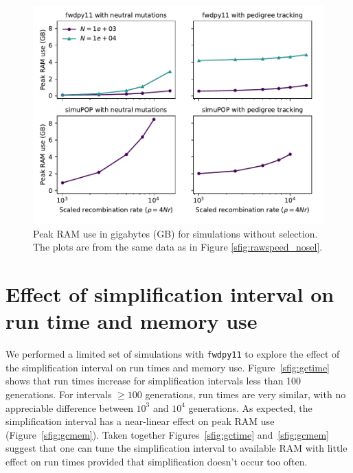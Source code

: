 \documentclass{article}
\newcommand{\fwdpy}{\texttt{fwdpy11}}
\begin{document}
\begin{figure}
    \includegraphics[]{sims/memuse_nosel}
    \caption{\label{sfig:ramnosel}Peak RAM use in gigabytes (GB) for simulations without selection.  The plots are from
    the same data as in Figure \ref{sfig:rawspeed_nosel}.}
\end{figure}

\newpage

\section{Effect of simplification interval on run time and memory use}
\label{ss:gcinterval}
\renewcommand{\thefigure}{C\arabic{figure}}

We performed a limited set of simulations with \fwdpy{} to explore the effect of the simplification interval on run times and memory
use. Figure~\ref{sfig:gctime} shows that run times increase for simplification intervals less than 100 generations.  For
intervals $\geq 100$ generations, run times are very similar, with no appreciable difference between $10^3$ and $10^4$
generations.  As expected, the simplification interval has a near-linear effect on peak RAM use
(Figure~\ref{sfig:gcmem}).  Taken together Figures~\ref{sfig:gctime} and~\ref{sfig:gcmem} suggest that one can tune the
simplification interval to available RAM with little effect on run times provided that simplification doesn't occur too
often.
\end{document}
